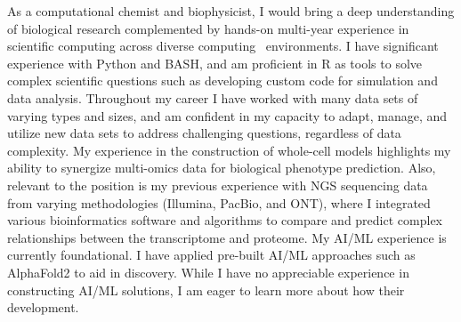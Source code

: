 \documentclass[11pt, a4paper]{awesome-cv}
\newcommand{\companyname}{Colossal Biosciences Inc}
\newcommand{\role}{Scientist, Computational Biology}
\newcommand{\brole}{\textbf{\role}}
\begin{document}
\begin{cvletter}
		\vspace{-10pt}	
		\vspace{-7.5pt}
		As a computational chemist and biophysicist, I would bring a deep understanding of biological research complemented by hands-on multi-year experience in scientific computing across diverse computing%
		~environments. %
		I have significant experience with Python and BASH, and am proficient in R as tools to solve complex scientific questions such as developing custom code for simulation and data analysis.
		Throughout my career I have worked with many data sets of varying types and sizes, and am confident in my capacity to adapt, manage, and utilize new data sets to address challenging questions, regardless of data complexity. 
		My experience in the construction of whole-cell models highlights my ability to synergize multi-omics data for biological phenotype prediction. 
		Also, relevant to the position is my previous experience with NGS sequencing data from varying methodologies (Illumina, PacBio, and ONT), where I integrated various bioinformatics software and algorithms to compare and predict complex relationships between the transcriptome and proteome. 
		My AI/ML experience is currently foundational. I have applied pre-built AI/ML approaches such as AlphaFold2 to aid in discovery. While I have no appreciable experience in constructing AI/ML solutions, I am eager to learn more about how their development.%

\end{cvletter}
\end{document}
